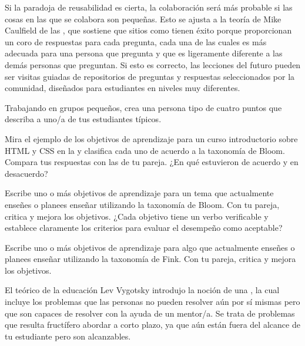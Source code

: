 Si la paradoja de reusabilidad es cierta,
la colaboración será más probable
si las cosas en las que se colabora son pequeñas.
Esto se ajusta a la teoría de Mike Caulfield  de las
,
que sostiene que sitios como
 tienen éxito porque
proporcionan un coro de respuestas para cada pregunta,
cada una de las cuales es más adecuada para
una persona que pregunta y que es ligeramente diferente a las demás personas que preguntan.
Si esto es correcto,
las lecciones del futuro pueden ser visitas guiadas de repositorios
de preguntas y respuestas seleccionados por la comunidad,
diseñados para estudiantes en niveles muy diferentes.
 
 
 
 
Trabajando en grupos pequeños,
crea una persona tipo de cuatro puntos que describa a uno/a de tus estudiantes típicos.
 
 
Mira el ejemplo de los objetivos de aprendizaje
para un curso introductorio sobre HTML y CSS
en la 
y clasifica cada uno de acuerdo a la taxonomía de Bloom.
Compara tus respuestas con las de tu pareja.
¿En qué estuvieron de acuerdo y en desacuerdo?
 
 
Escribe uno o más objetivos de aprendizaje
para un tema que actualmente enseñes o planees enseñar
utilizando la taxonomía de Bloom.
Con tu pareja,
critica y mejora los objetivos.
¿Cada objetivo tiene un verbo verificable y establece claramente
los criterios para evaluar el desempeño como aceptable?
 
 
Escribe uno o más objetivos de aprendizaje
para algo que actualmente enseñes o planees enseñar
utilizando la taxonomía de Fink.
Con tu pareja,
critica y mejora los objetivos.
 
 
El teórico de la educación Lev Vygotsky introdujo la noción de una
,
la cual incluye los problemas que las personas no pueden resolver aún por sí mismas
pero que son capaces de resolver con la ayuda de un mentor/a.
Se trata de problemas que resulta fructífero abordar a corto plazo,
ya que aún están fuera del alcance de tu estudiante pero son alcanzables.
 
